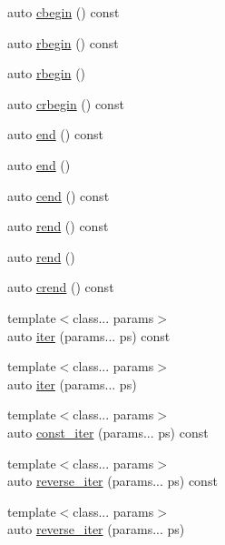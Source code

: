 \begin{DoxyCompactItemize}
\item 
auto \hyperlink{classbc_1_1tensors_1_1Tensor__Base_a8cf2ebf74960d805544b77bb63d60581}{cbegin} () const
\item 
auto \hyperlink{classbc_1_1tensors_1_1Tensor__Base_ac00d10e279006dbdd13345d73824424c}{rbegin} () const
\item 
auto \hyperlink{classbc_1_1tensors_1_1Tensor__Base_a62eb4a1d5290265d64cccd58d69a89eb}{rbegin} ()
\item 
auto \hyperlink{classbc_1_1tensors_1_1Tensor__Base_a9c01f2b26b657f8cfdc426c52c6d424a}{crbegin} () const
\item 
auto \hyperlink{classbc_1_1tensors_1_1Tensor__Base_a07e6bf80344d58606a1e7e9cc0c86a09}{end} () const
\item 
auto \hyperlink{classbc_1_1tensors_1_1Tensor__Base_a7fc3c7000d27c8861957bd40dad15b23}{end} ()
\item 
auto \hyperlink{classbc_1_1tensors_1_1Tensor__Base_a36c4eaacee606e151ca6f70d9b41c26d}{cend} () const
\item 
auto \hyperlink{classbc_1_1tensors_1_1Tensor__Base_a91727f32f3b0182772ebb7968259c5e1}{rend} () const
\item 
auto \hyperlink{classbc_1_1tensors_1_1Tensor__Base_a667843a7f555dc076ae8db43a77d38b7}{rend} ()
\item 
auto \hyperlink{classbc_1_1tensors_1_1Tensor__Base_aed3b6743b9f37bc524d3819515b2f2f6}{crend} () const
\item 
{\footnotesize template$<$class... params$>$ }\\auto \hyperlink{classbc_1_1tensors_1_1Tensor__Base_a976e88a1c2a72c4d8239f6667c55613c}{iter} (params... ps) const
\item 
{\footnotesize template$<$class... params$>$ }\\auto \hyperlink{classbc_1_1tensors_1_1Tensor__Base_aa8ac3b29d433a70e336e4b67779c700a}{iter} (params... ps)
\item 
{\footnotesize template$<$class... params$>$ }\\auto \hyperlink{classbc_1_1tensors_1_1Tensor__Base_aba4ea57d3cabe2b73af3087f310ed6bc}{const\+\_\+iter} (params... ps) const
\item 
{\footnotesize template$<$class... params$>$ }\\auto \hyperlink{classbc_1_1tensors_1_1Tensor__Base_aca9fe3360591d4220c579120e1d3bb2f}{reverse\+\_\+iter} (params... ps) const
\item 
{\footnotesize template$<$class... params$>$ }\\auto \hyperlink{classbc_1_1tensors_1_1Tensor__Base_a26ec0cd51fdf965a59dcb79a0da7327f}{reverse\+\_\+iter} (params... ps)

\end{DoxyCompactItemize}
